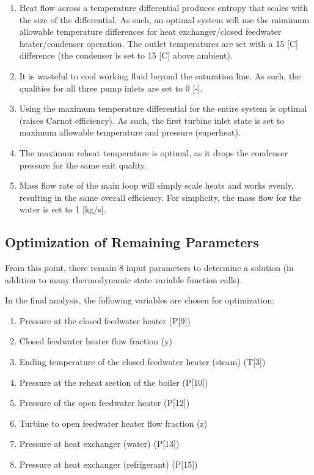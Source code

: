 \documentclass[10pt,cleanfoot]{asme2ej}
\begin{document}
\begin{enumerate}
\item
Heat flow across a temperature differential produces entropy that scales with the size of the differential. As such, an optimal system will use the mimimum allowable temperature differences for heat exchanger/closed feedwater heater/condenser operation. The outlet temperatures are set with a 15 [C] difference (the condenser is set to 15 [C] above ambient).
\item
It is wasteful to cool working fluid beyond the saturation line. As such, the qualities for all three pump inlets are set to 0 [-].
\item
Using the maximum temperature differential for the entire system is optimal (raises Carnot efficiency). As such, the first turbine inlet state is set to maximum allowable temperature and pressure (superheat).
\item
The maximum reheat temperature is optimal, as it drops the condenser pressure for the same exit quality.
\item
Mass flow rate of the main loop will simply scale heats and works evenly, resulting in the same overall efficiency. For simplicity, the mass flow for the water is set to 1 [kg/s].
\end{enumerate}

\subsection{Optimization of Remaining Parameters}

From this point, there remain 8 input parameters to determine a solution (in addition to many thermodynamic state variable function calls).

In the final analysis, the following variables are chosen for optimization:

\begin{enumerate}
\item
Pressure at the closed feedwater heater (P[9])
\item
Closed feedwater heater flow fraction (y)
\item
Ending temperature of the closed feedwater heater (steam) (T[3])
\item
Pressure at the reheat section of the boiler (P[10])
\item
Pressure of the open feedwater heater (P[12])
\item
Turbine to open feedwater heater flow fraction (z)

\item
Pressure at heat exchanger (water) (P[13])
\item
Pressure at heat exchanger (refrigerant) (P[15])
\end{enumerate}
\end{document}
